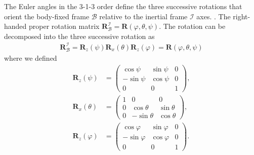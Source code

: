 \documentclass[lineno, pdflatex,sn-mathphys-ay]{sn-jnl}
\theoremstyle{thmstyleone}%
\theoremstyle{thmstyletwo}%
\theoremstyle{thmstylethree}%
\renewcommand{\vec}[1]{\boldsymbol{#1}}
\begin{document}
\begin{appendices}
The Euler angles in the 3-1-3 order define the three successive rotations that orient the body-fixed frame $\mathcal{B}$ relative to the inertial frame $\mathcal{I}$ axes.
\citep[see, e.g.,][]{Broucke1990doi:10.2514/3.20591}.
The right-handed proper rotation matrix 
${\vec{R}_{\mathcal{B}}^{\mathcal{I}} = \vec{R}(\varphi,\theta,\psi)}$.
%
The rotation can be decomposed into the three successive rotation as
\begin{align}
\vec{R}_{\mathcal{B}}^{\mathcal{I}}= 
\vec{R}_{z}(\psi)
\vec{R}_{x}(\theta)
\vec{R}_{z}(\varphi)
= \vec{R}(\varphi,\theta,\psi)
\end{align}
%
where we defined
%
\begin{align}
	\vec{R}_{z}(\psi) &= 
\begin{pmatrix}
	\cos\psi & \sin\psi & 0 \\
	-\sin\psi & \cos\psi & 0 \\
	0 & 0 & 1
\end{pmatrix}, \\ %
\vec{R}_{x}(\theta) & =
	\begin{pmatrix}
1 & 0 & 0 \\
0 & \cos\theta & \sin\theta \\
0 & -\sin\theta & \cos\theta
\end{pmatrix}, \\ %
\vec{R}_{z}(\varphi) & =
	\begin{pmatrix}
\cos\varphi & \sin\varphi & 0 \\
-\sin\varphi & \cos\varphi & 0 \\
0 & 0 & 1
\end{pmatrix}.
\end{align}
%



\end{appendices}
\end{document}
